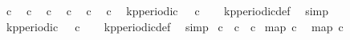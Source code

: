 \begin{isabellebody}
\isanewline
{}\isamarkupfalse%
\ {\isacartoucheopen}c{}\ {}{\isacartoucheclose}\isanewline
{}\isamarkupfalse%
\ {\isacartoucheopen}c{}\ {}{\isacartoucheclose}\isanewline
{}\isamarkupfalse%
\ {\isacartoucheopen}c{}\ {}{\isacartoucheclose}\isanewline
{}\isamarkupfalse%
\ {\isacartoucheopen}c{}\ {}{\isacartoucheclose}\isanewline
{}\isamarkupfalse%
\ {\isacartoucheopen}c{}\ {}{\isacartoucheclose}\isanewline
{}\isamarkupfalse%
\ {\isacartoucheopen}c{}\ {}{\isacartoucheclose}\isanewline
\isanewline
{}\isamarkupfalse%
\ {\isacartoucheopen}kp{\isacharunderscore}periodic\ {}\ {}\ c{}{\isacartoucheclose}\isanewline
%
\isadelimproof
\ \ %
\endisadelimproof
%
\isatagproof
{}\isamarkupfalse%
\ kp{\isacharunderscore}periodic{\isacharunderscore}def\ \isamarkupfalse%
\ simp%
\endisatagproof
{\isafoldproof}%
%
\isadelimproof
\isanewline
%
\endisadelimproof
\isanewline
{}\isamarkupfalse%
\ {\isacartoucheopen}kp{\isacharunderscore}periodic\ {}\ {}\ c{}{\isacartoucheclose}\isanewline
%
\isadelimproof
\ \ %
\endisadelimproof
%
\isatagproof
{}\isamarkupfalse%
\ kp{\isacharunderscore}periodic{\isacharunderscore}def\ \isamarkupfalse%
\ simp%
\endisatagproof
{\isafoldproof}%
%
\isadelimproof
\isanewline
%
\endisadelimproof
\isanewline
{}\isamarkupfalse%
\ {\isacartoucheopen}c{}\ {\isasymequiv}\ c{}\ {\isasymoplus}\ c{}{\isacartoucheclose}\isanewline
\isanewline
{}\isamarkupfalse%
\ {\isacartoucheopen}map\ c{}\ {\isacharbrackleft}{}{\isacharcomma}{}{\isacharcomma}{}{\isacharcomma}{}{\isacharcomma}{}{\isacharcomma}{}{\isacharcomma}{}{\isacharcomma}{}{\isacharcomma}{}{\isacharcomma}{}{\isacharcomma}{}{}{\isacharbrackright}{\isacartoucheclose}\isanewline
{}\isamarkupfalse%
\ {\isacartoucheopen}map\ {\isacharparenleft}{\isachardollar}c{}{\isacharparenright}\ {\isacharbrackleft}{}{\isacharcomma}{}{\isacharcomma}{}{\isacharcomma}{}{\isacharcomma}{}{\isacharcomma}{}{\isacharcomma}{}{\isacharcomma}{}{\isacharcomma}{}{\isacharcomma}{}{\isacharcomma}{}{}{\isacharcomma}{}{}{\isacharbrackright}{\isacartoucheclose}\isanewline

\end{isabellebody}
